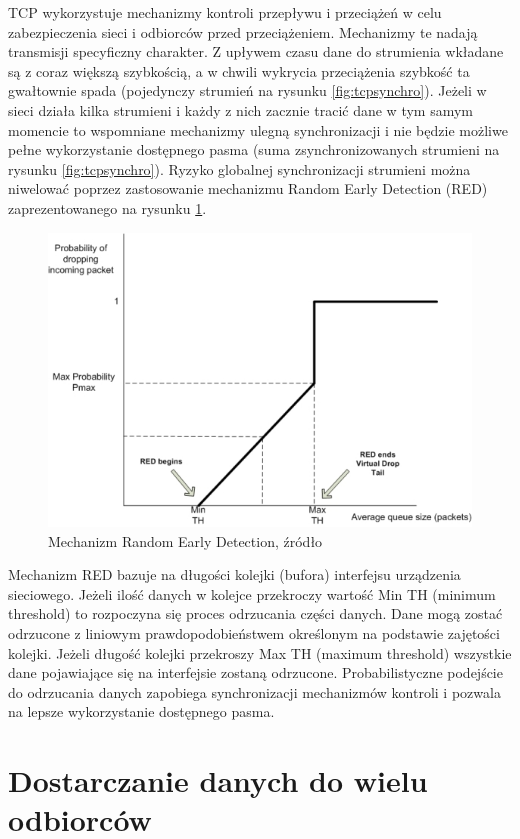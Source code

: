 TCP wykorzystuje mechanizmy kontroli przepływu i przeciążeń w celu zabezpieczenia sieci i odbiorców przed przeciążeniem. Mechanizmy te nadają transmisji specyficzny charakter. Z upływem czasu dane do strumienia wkładane są z coraz większą szybkością, a w chwili wykrycia przeciążenia szybkość ta gwałtownie spada (pojedynczy strumień na rysunku \ref{fig:tcpsynchro}). Jeżeli w sieci działa kilka strumieni i każdy z nich zacznie tracić dane w tym samym momencie to wspomniane mechanizmy ulegną synchronizacji i nie będzie możliwe pełne wykorzystanie dostępnego pasma (suma zsynchronizowanych strumieni na rysunku \ref{fig:tcpsynchro}). Ryzyko globalnej synchronizacji strumieni można niwelować poprzez zastosowanie mechanizmu Random Early Detection (RED) zaprezentowanego na rysunku \ref{fig:red}.

\begin{figure}[h!]
	\centering
		\includegraphics[width=0.8\linewidth]{red}
	\caption{Mechanizm Random Early Detection, źródło \cite{red-mechanism}}
	\label{fig:red}
\end{figure}

Mechanizm RED bazuje na długości kolejki (bufora) interfejsu urządzenia sieciowego. Jeżeli ilość danych w kolejce przekroczy wartość Min TH (minimum threshold) to rozpoczyna się proces odrzucania części danych. Dane mogą zostać odrzucone z liniowym prawdopodobieństwem określonym na podstawie zajętości kolejki. Jeżeli długość kolejki przekroszy Max TH (maximum threshold) wszystkie dane pojawiające się na interfejsie zostaną odrzucone. Probabilistyczne podejście do odrzucania danych zapobiega synchronizacji mechanizmów kontroli i pozwala na lepsze wykorzystanie dostępnego pasma.

\section{Dostarczanie danych do wielu odbiorców}

